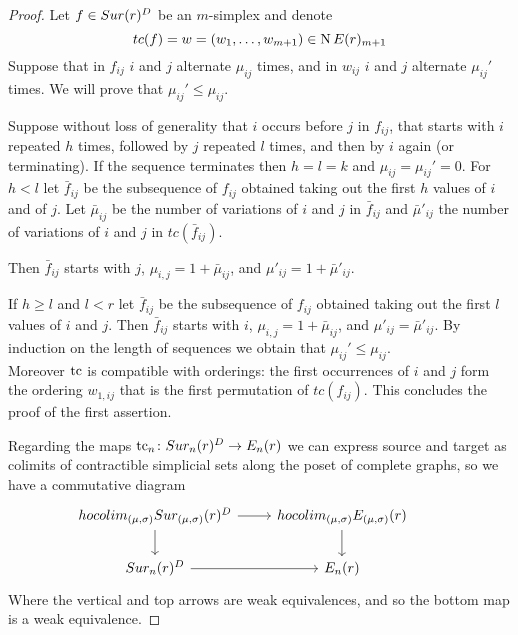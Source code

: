\begin{proof}
	Let $f\in Sur(r)^{D}$ be an $m$-simplex and denote
	$$tc(f)=w=(w_{1},\dots,w_{m+1})\in \operatorname{N}E(r)_{m+1}$$
	Suppose that in $f_{ij}$ $i$ and $j$ alternate $\mu_{ij}$ times, and in $w_{ij}$ $i$ and $j$ alternate $\mu_{ij}'$ times.
	We will prove that
	$\mu_{ij}' \leq \mu_{ij}$.

	Suppose without loss of generality that $i$ occurs before $j$ in $f_{ij}$, that starts with $i$ repeated $h$ times, followed by $j$ repeated $l$ times, and
	then by $i$ again (or terminating).
	If the sequence terminates then $h=l=k$ and $\mu_{ij}=\mu_{ij}'=0$.
	For $h <l$
	let $\bar{f}_{ij}$ be the subsequence of $f_{ij}$
	obtained taking out the first $h$ values of $i$ and of $j$.
	Let $\bar{\mu}_{ij}$ be the number of variations of $i$ and $j$ in $\bar{f}_{ij}$
	and $\bar{\mu}'_{ij}$ the number of variations of $i$ and $j$ in $tc(\bar{f}_{ij})$.

	Then $\bar{f}_{ij}$
	starts with $j$,
	$\mu_{i,j}=1+\bar{\mu}_{ij}$,
	and $\mu'_{ij}=1+\bar{\mu}'_{ij}$.

	If $h \geq l$ and $l<r$
	let $\bar{f}_{ij}$ be the subsequence of $f_{ij}$ obtained taking out the first $l$ values of $i$ and $j$.
	Then $\bar{f}_{ij}$
	starts with $i$,
	$\mu_{i,j}=1+\bar{\mu}_{ij}$,
	and $\mu'_{ij}=\bar{\mu}'_{ij}$.
	By induction on the length of sequences we obtain that
	$\mu_{ij}'\le \mu_{ij}$.\\
	Moreover $\operatorname{tc}$ is compatible with orderings: the first occurrences of $i$ and $j$ form the ordering $w_{1,ij}$ that is the first permutation of $tc(f_{ij})$.
	This concludes the proof of the first assertion.

	Regarding the maps $\operatorname{tc}_{n} \colon Sur_{n}(r)^{D}\rightarrow E_{n}(r)$ we can express source and target as colimits of contractible %
	simplicial sets along the poset of complete graphs,
	so we have a commutative diagram
	\begin{equation*}
		\begin{tikzcd}
			hocolim_{(\mu,\sigma)}\sur_{(\mu,\sigma)}(r)^{D} \arrow[r] \arrow[d] & hocolim_{(\mu,\sigma)}\BE_{(\mu,\sigma)}(r) \arrow[d] \\
			\sur_{n}(r)^{D}\arrow[r] & \BE_{n}(r) &
		\end{tikzcd}
	\end{equation*}
	Where the vertical and top arrows
	are weak equivalences, and so the bottom map is a weak equivalence.
\end{proof}